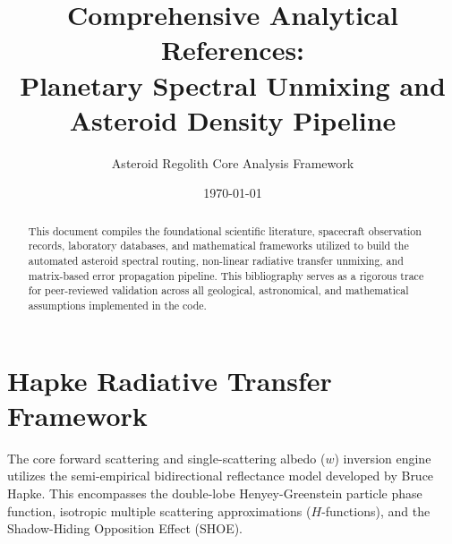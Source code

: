 \documentclass[11pt,letterpaper]{article}
\title{Comprehensive Analytical References:\\Planetary Spectral Unmixing and Asteroid Density Pipeline}
\author{Asteroid Regolith Core Analysis Framework}
\date{\today}
\begin{document}
\maketitle

\begin{abstract}
This document compiles the foundational scientific literature, spacecraft observation records, laboratory databases, and mathematical frameworks utilized to build the automated asteroid spectral routing, non-linear radiative transfer unmixing, and matrix-based error propagation pipeline. This bibliography serves as a rigorous trace for peer-reviewed validation across all geological, astronomical, and mathematical assumptions implemented in the code.
\end{abstract}

\section{Hapke Radiative Transfer Framework}
The core forward scattering and single-scattering albedo ($w$) inversion engine utilizes the semi-empirical bidirectional reflectance model developed by Bruce Hapke. This encompasses the double-lobe Henyey-Greenstein particle phase function, isotropic multiple scattering approximations ($H$-functions), and the Shadow-Hiding Opposition Effect (SHOE).
\end{document}
